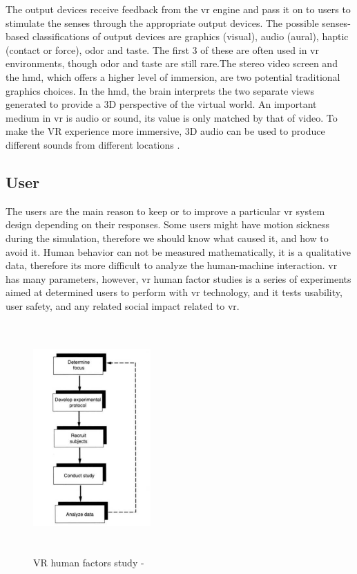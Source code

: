  The output devices receive feedback from the \acrshort{vr} engine and pass it on to users to stimulate the senses through the appropriate output devices. The possible senses-based classifications of output devices are graphics (visual), audio (aural), haptic (contact or force), odor and taste. The first 3 of these are often used in \acrshort{vr} environments, though odor and taste are still rare.The stereo video screen and the \acrfull{hmd}, which offers a higher level of immersion, are two potential traditional graphics choices. In the \acrshort{hmd}, the brain interprets the two separate views generated to provide a 3D perspective of the virtual world. An important medium in \acrshort{vr} is audio or sound, its value is only matched by that of video. To make the VR experience more immersive, 3D audio can be used to produce different sounds from different locations \citep{burdea2017virtual, Bamodu2013VirtualComponents}.



\subsection{User}

The users are the main reason to keep or to improve a particular \acrshort{vr} system design depending on their responses. Some users might have motion sickness during the simulation, therefore we should know what caused it, and how to avoid it. Human behavior can not be measured mathematically, it is a qualitative data, therefore its more difficult to analyze the human-machine interaction. \acrshort{vr} has many parameters, however, \acrshort{vr} human factor studies is a series of experiments aimed at determined users to perform with \acrshort{vr} technology, and it tests usability, user safety, and any related social impact related to \acrshort{vr}. 

\begin{figure}[ht]
    \centering
    \includegraphics[width=0.40\textwidth, height=250pt]{images/VRhf.png}
    \caption{VR human factors study - \citep{burdea2017virtual}}
    \label{fig:vrhf}
\end{figure}

